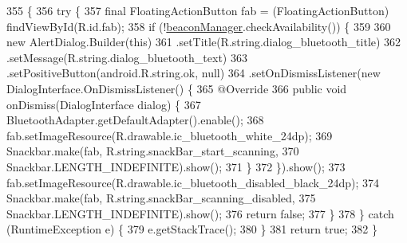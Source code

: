 \begin{DoxyCode}
355                                            \{
356         \textcolor{keywordflow}{try} \{
357             \textcolor{keyword}{final} FloatingActionButton fab = (FloatingActionButton) findViewById(R.id.fab);
358             \textcolor{keywordflow}{if} (!\hyperlink{classit_1_1unibo_1_1torsello_1_1bluetoothpositioning_1_1activities_1_1ApplicationActivity_a973c37226a3dbba6016966c3555aff65_a973c37226a3dbba6016966c3555aff65}{beaconManager}.checkAvailability()) \{
359 
360                 \textcolor{keyword}{new} AlertDialog.Builder(\textcolor{keyword}{this})
361                         .setTitle(R.string.dialog\_bluetooth\_title)
362                         .setMessage(R.string.dialog\_bluetooth\_text)
363                         .setPositiveButton(android.R.string.ok, null)
364                         .setOnDismissListener(\textcolor{keyword}{new} DialogInterface.OnDismissListener() \{
365                             @Override
366                             \textcolor{keyword}{public} \textcolor{keywordtype}{void} onDismiss(DialogInterface dialog) \{
367                                 BluetoothAdapter.getDefaultAdapter().enable();
368                                 fab.setImageResource(R.drawable.ic\_bluetooth\_white\_24dp);
369                                 Snackbar.make(fab, R.string.snackBar\_start\_scanning,
370                                         Snackbar.LENGTH\_INDEFINITE).show();
371                             \}
372                         \}).show();
373                 fab.setImageResource(R.drawable.ic\_bluetooth\_disabled\_black\_24dp);
374                 Snackbar.make(fab, R.string.snackBar\_scanning\_disabled,
375                         Snackbar.LENGTH\_INDEFINITE).show();
376                 \textcolor{keywordflow}{return} \textcolor{keyword}{false};
377             \}
378         \} \textcolor{keywordflow}{catch} (RuntimeException e) \{
379             e.getStackTrace();
380         \}
381         \textcolor{keywordflow}{return} \textcolor{keyword}{true};
382     \}
\end{DoxyCode}
\hypertarget{classit_1_1unibo_1_1torsello_1_1bluetoothpositioning_1_1activities_1_1ApplicationActivity_a0cdfc0658ba462b43e9e6b94bab90da1_a0cdfc0658ba462b43e9e6b94bab90da1}{}\label{classit_1_1unibo_1_1torsello_1_1bluetoothpositioning_1_1activities_1_1ApplicationActivity_a0cdfc0658ba462b43e9e6b94bab90da1_a0cdfc0658ba462b43e9e6b94bab90da1} 
